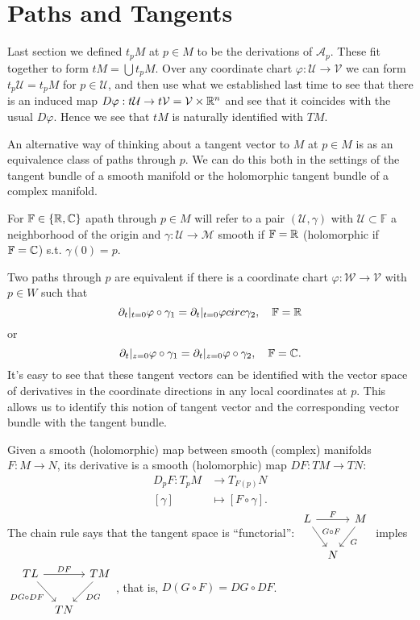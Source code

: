 \section{Paths and Tangents}

Last section we defined $t_pM$ at $p \in M$ to be the derivations of $\mathcal{A}_p$. These fit together to form $tM=\bigcup t_pM $. Over any coordinate chart $\varphi:\mathcal{U}\to \mathcal{V}$ we can form $t_p\mathcal{U}=t_pM$ for $p \in \mathcal{U}$, and then use what we established last time to see that there is an induced map $D\varphi:t\mathcal{U}\to t\mathcal{V}=\mathcal{V}\times \mathbb{R}^{n}$ and see that it coincides with the usual $D\varphi$. Hence we see that $tM$ is naturally identified with $TM$. 

An alternative way of thinking about a tangent vector to $M$ at $p \in M$ is as an equivalence class of paths through $p$. We can do this both in the settings of the tangent bundle of a smooth manifold or the holomorphic tangent bundle of a complex manifold.

For $\mathbb{F}\in \left\{\mathbb{R},\mathbb{C}\right\} $ apath through $p \in M$ will refer to a pair $\left( \mathcal{U},\gamma \right) $ with $\mathcal{U}\subset \mathbb{F}$ a neighborhood of the origin and $\gamma:\mathcal{U}\to \mathcal{M}$ smooth if $\mathbb{F}=\mathbb{R}$ (holomorphic if $\mathbb{F}=\mathbb{C}$) s.t. $\gamma(0)=p$.

Two paths through $p$ are equivalent if there is a coordinate chart $\varphi:\mathcal{W}\to \mathcal{V}$ with $p \in W$ such that 
\[
\partial_t|_{t=0}\varphi\circ \gamma_1=\partial_t|_{t=0}\varphi circ \gamma_2,\quad  \mathbb{F}=\mathbb{R}
\] 
or 
\[
\partial_t|_{z=0}\varphi\circ \gamma_1=\partial_t|_{z=0}\varphi\circ \gamma_2,\quad \mathbb{F}=\mathbb{C}.
\] 
It's easy to see that these tangent vectors can be identified with the vector space of derivatives in the coordinate directions in any local coordinates at $p$. This allows us to identify this notion of tangent vector and the corresponding vector bundle with the tangent bundle.

Given a smooth (holomorphic) map between smooth (complex) manifolds $F:M\to N$, its derivative is a smooth (holomorphic) map $DF:TM\to TN$:
 \begin{align*}
   D_p F: T_p M &\longrightarrow T_{F(p)}N \\
  \left[ \gamma \right]  &\longmapsto \left[ F\circ \gamma \right] 
.\end{align*}
The chain rule says that the tangent space is ``functorial'':
$
\begin{tikzcd}[column sep= tiny]
  L\arrow[rr,"F"] \arrow[rd,"G\circ F"]  & & M \arrow[ld,"G"] \\
  & N &
\end{tikzcd}
$ 
imples $
\begin{tikzcd}[column sep= tiny]
  TL\arrow[rr,"DF"] \arrow[rd,"DG\circ DF"'] & & TM \arrow[ld,"DG"] \\
			  &TN&
\end{tikzcd}$, that is, $D\left( G\circ F \right) =DG\circ DF$.


